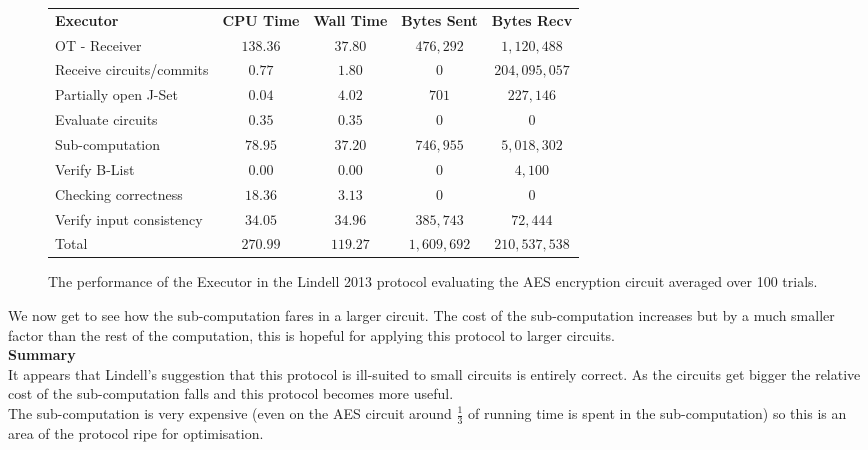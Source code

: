 \documentclass[ %
                    author={Nicholas Tutte},
                supervisor={Prof. Nigel Smart},
                    degree={MEng},
                     title={Secure Two Party Computation},
                  subtitle={A practical comparison of recent protocols},
                      type={Research - GG1K},
                      year={2015} ]{dissertation}
\begin{document}
				\begin{figure}[!ht]
					\begin{tabular}{| p{4.3cm} | c c c c |}
						\hline
						\textbf{Executor} & \textbf{CPU Time} & \textbf{Wall Time} & \textbf{Bytes Sent} & \textbf{Bytes Recv} \\
						\thickhline
						OT - Receiver & $138.36$ & $37.80$ & $476,292$ & $1,120,488$ \\
						\hline
						Receive circuits/commits & $0.77$ & $1.80$ & $0$ & $204,095,057$ \\
						\hline
						Partially open J-Set & $0.04$ & $4.02$ & $701$ & $227,146$ \\
						\hline
						Evaluate circuits & $0.35$ & $0.35$ & $0$ & $0$ \\
						\hline
						Sub-computation & $78.95$ & $37.20$ & $746,955$ & $5,018,302$ \\
						\hline
						Verify B-List & $0.00$ & $0.00$ & $0$ & $4,100$ \\
						\hline
						Checking correctness & $18.36$ & $3.13$ & $0$ & $0$ \\
						\hline
						Verify input consistency & $34.05$ & $34.96$ & $385,743$ & $72,444$ \\
						\thickhline
						Total & $270.99$ & $119.27$ & $1,609,692$ & $210,537,538$ \\
						\hline
					\end{tabular}
					\caption{The performance of the Executor in the Lindell 2013 protocol evaluating the AES encryption circuit averaged over 100 trials. \label{table:L_2013_AES_Executor}}
				\end{figure}
				\FloatBarrier

				We now get to see how the sub-computation fares in a larger circuit. The cost of the sub-computation increases but by a much smaller factor than the rest of the computation, this is hopeful for applying this protocol to larger circuits.\\

				\noindent\textbf{Summary}\\

					It appears that Lindell's suggestion that this protocol is ill-suited to small circuits is entirely correct. As the circuits get bigger the relative cost of the sub-computation falls and this protocol becomes more useful.\\

					The sub-computation is very expensive (even on the AES circuit around $\frac{1}{3}$ of running time is spent in the sub-computation) so this is an area of the protocol ripe for optimisation.\\
\end{document}
